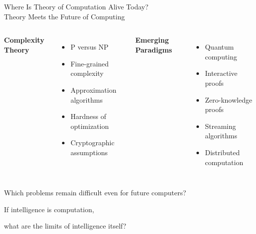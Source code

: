 \documentclass[10pt,aspectratio=169]{beamer}
\begin{document}
\begin{frame}{Where Is Theory of Computation Alive Today?\\
Theory Meets the Future of Computing}

\begin{columns}[T]

\textbf{Complexity Theory}

\begin{itemize}
\item P versus NP
\item Fine-grained complexity
\item Approximation algorithms
\item Hardness of optimization
\item Cryptographic assumptions
\end{itemize}

\textbf{Emerging Paradigms}

\begin{itemize}
\item Quantum computing
\item Interactive proofs
\item Zero-knowledge proofs
\item Streaming algorithms
\item Distributed computation
\end{itemize}

\end{columns}

\vfill

\begin{center}
\alert{Which problems remain difficult even for future computers?}
\end{center}

\end{frame}

\begin{frame}[standout]
If intelligence is computation,

\vspace{1em}
what are the limits of intelligence itself?
\end{frame}

\end{document}
